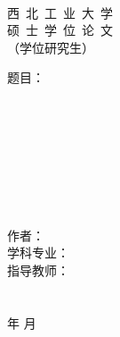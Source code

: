 \begin{titlepage}
	\sSanhao ~
	\begin{spacing}{1.5}
		\begin{center}
			\begin{center}
				\sSanhao 西~北~工~业~大~学 \\
				\sYihao 硕~士~学~位~论~文 \\
				\sSihao （学位研究生）\\
			\end{center}
			\vskip 5cm
			\fSong \sErhao \hspace{1em} 题目：\hspace{0.2cm} \\
			\hspace{1em} \phantom{大空格}\hspace{0.2cm} \\
			\fSong \sWuhao ~ \\
			\fSong \sWuhao ~ \\
			\fSong \sWuhao ~ \\
			\fSong \sWuhao ~ \\
			\fSong \sWuhao ~ \\
			\fSong \sWuhao ~ \\
			\fSong \sWuhao ~ \\
			\sSanhao 作\phantom{空格}者： \\
			\sSanhao 学科专业： \\
			\sSanhao 指导教师： \\
			\fSong \sWuhao ~ \\
			\fSong \sWuhao ~ \\
			\fSong \sSanhao {}\fSong 年 \fSong 月
		\end{center}
	\end{spacing}
\end{titlepage}

\fSong \normalsize

\endinput